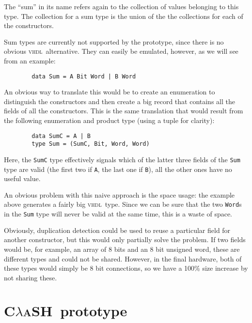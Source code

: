 \documentclass[conference,pdf,a4paper,10pt,final,twoside,twocolumn]{IEEEtran}
\def\VHDL{\textsc{vhdl}}
\def\CLaSH{\textsc{C$\lambda$aSH}}
\def\hs#1{\texttt{#1}}
\begin{document}
\begin{description}
        The ``sum'' in its name refers again to the collection of values
        belonging to this type. The collection for a sum type is the
        union of the the collections for each of the constructors.

        Sum types are currently not supported by the prototype, since there is
        no obvious \VHDL\ alternative. They can easily be emulated, however, as
        we will see from an example:

        \begin{verbatim}
        data Sum = A Bit Word | B Word
        \end{verbatim}

        An obvious way to translate this would be to create an enumeration to
        distinguish the constructors and then create a big record that
        contains all the fields of all the constructors. This is the same
        translation that would result from the following enumeration and
        product type (using a tuple for clarity):

        \begin{verbatim}
        data SumC = A | B
        type Sum = (SumC, Bit, Word, Word)
        \end{verbatim}

        Here, the \hs{SumC} type effectively signals which of the latter three
        fields of the \hs{Sum} type are valid (the first two if \hs{A}, the
        last one if \hs{B}), all the other ones have no useful value.

        An obvious problem with this naive approach is the space usage: the
        example above generates a fairly big \VHDL\ type. Since we can be
        sure that the two \hs{Word}s in the \hs{Sum} type will never be valid
        at the same time, this is a waste of space.

        Obviously, duplication detection could be used to reuse a
        particular field for another constructor, but this would only
        partially solve the problem. If two fields would be, for
        example, an array of 8 bits and an 8 bit unsigned word, these are
        different types and could not be shared. However, in the final
        hardware, both of these types would simply be 8 bit connections,
        so we have a 100\% size increase by not sharing these.
      \end{description}


\section{\CLaSH\ prototype}
\end{document}
